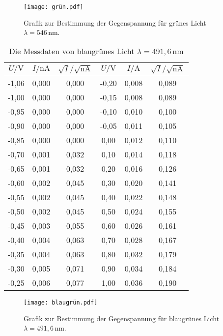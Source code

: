   \begin{figure}[H]
    \centering
    \texttt{[image: grün.pdf]}
    \caption{Grafik zur Bestimmung der Gegenspannung für grünes Licht $ \lambda = 546\,\text{nm}$.}
    \label{fig:grün}
  \end{figure}
  \noindent
  \begin{table}[H]
    \centering
    \caption{Die Messdaten von blaugrünes Licht $\lambda = 491,6\,\text{nm}$ }
    \label{tab:blaugrün}
    \begin{tabular}{| c | c |c||c|c|c| }
    \toprule
    $U/\mathrm{V}$ &$I/\mathrm{nA}$  &  $\sqrt{I}/\sqrt{\mathrm{nA}}$&$U/\mathrm{V}$ & $I/\mathrm{A} $& $\sqrt{I}/\sqrt{\mathrm{nA}}$  \\
    \midrule
    
    -1,06	& 0,000	& 0,000& 	-0,20	& 0,008	& 0,089 \\
    -1,00	& 0,000	& 0,000& 	-0,15	& 0,008	& 0,089 \\
    -0,95	& 0,000	& 0,000& 	-0,10	& 0,010	& 0,100 \\
    -0,90	& 0,000	& 0,000& 	-0,05	& 0,011	& 0,105 \\
    -0,85	& 0,000	& 0,000& 	0,00	& 0,012	& 0,110 \\
    -0,70	& 0,001	& 0,032& 	0,10	& 0,014	& 0,118 \\
    -0,65	& 0,001	& 0,032& 	0,20	& 0,016	& 0,126 \\
    -0,60	& 0,002	& 0,045& 	0,30	& 0,020	& 0,141 \\
    -0,55	& 0,002	& 0,045& 	0,40	& 0,022	& 0,148 \\
    -0,50	& 0,002	& 0,045& 	0,50	& 0,024	& 0,155 \\
    -0,45	& 0,003	& 0,055& 	0,60	& 0,026	& 0,161 \\
    -0,40	& 0,004	& 0,063& 	0,70	& 0,028	& 0,167 \\
    -0,35	& 0,004	& 0,063& 	0,80	& 0,032	& 0,179 \\
    -0,30	& 0,005	& 0,071& 	0,90	& 0,034	& 0,184 \\
    -0,25	& 0,006	& 0,077& 	1,00	& 0,036	& 0,190 \\
      \bottomrule
      \end{tabular}
    \end{table}

  \begin{figure}[H]
    \centering
    \texttt{[image: blaugrün.pdf]}
    \caption{Grafik zur Bestimmung der Gegenspannung für blaugrünes Licht $ \lambda =491,6\, \text{nm}$.}
    \label{fig:blaugrün}
  \end{figure}
  \noindent

